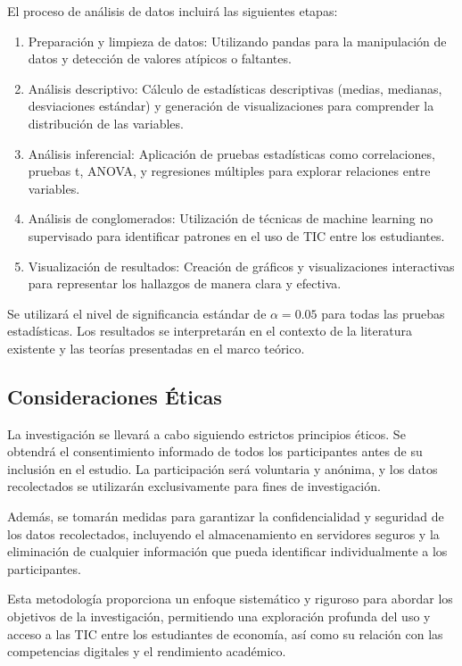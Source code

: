 \documentclass[12pt, a4paper]{article}
\begin{document}
El proceso de análisis de datos incluirá las siguientes etapas:

\begin{enumerate}
    \item Preparación y limpieza de datos: Utilizando pandas para la manipulación de datos y detección de valores atípicos o faltantes.
    \item Análisis descriptivo: Cálculo de estadísticas descriptivas (medias, medianas, desviaciones estándar) y generación de visualizaciones para comprender la distribución de las variables.
    \item Análisis inferencial: Aplicación de pruebas estadísticas como correlaciones, pruebas t, ANOVA, y regresiones múltiples para explorar relaciones entre variables.
    \item Análisis de conglomerados: Utilización de técnicas de machine learning no supervisado para identificar patrones en el uso de TIC entre los estudiantes.
    \item Visualización de resultados: Creación de gráficos y visualizaciones interactivas para representar los hallazgos de manera clara y efectiva.
\end{enumerate}

Se utilizará el nivel de significancia estándar de $\alpha = 0.05$ para todas las pruebas estadísticas. Los resultados se interpretarán en el contexto de la literatura existente y las teorías presentadas en el marco teórico.

\subsection{Consideraciones Éticas}

La investigación se llevará a cabo siguiendo estrictos principios éticos. Se obtendrá el consentimiento informado de todos los participantes antes de su inclusión en el estudio. La participación será voluntaria y anónima, y los datos recolectados se utilizarán exclusivamente para fines de investigación. 

Además, se tomarán medidas para garantizar la confidencialidad y seguridad de los datos recolectados, incluyendo el almacenamiento en servidores seguros y la eliminación de cualquier información que pueda identificar individualmente a los participantes.

Esta metodología proporciona un enfoque sistemático y riguroso para abordar los objetivos de la investigación, permitiendo una exploración profunda del uso y acceso a las TIC entre los estudiantes de economía, así como su relación con las competencias digitales y el rendimiento académico.


\newpage
\printbibliography
\end{document}
